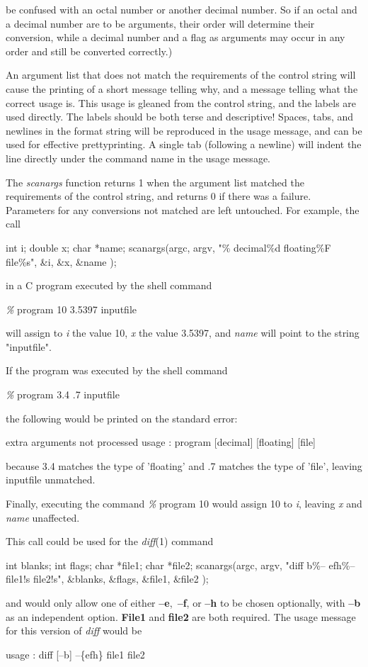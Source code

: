 be confused with an octal number or another decimal number. So if an
octal and a decimal number are to be arguments, their order will determine
their conversion, while a decimal number and a flag as arguments may occur
in any order and still be converted correctly.)
\par
An argument list that does not match the requirements of the control
string will cause the printing of a short message telling why, and
a message telling what the correct usage is.
This usage is gleaned from the control string, and the labels are used
directly.  The labels should be both terse and descriptive!  Spaces, tabs,
and newlines in the format string will be reproduced in the usage message,
and can be used for effective prettyprinting.  A single tab (following a
newline) will indent the line directly under the command name in the usage
message.
\par
The
{\it scanargs}
function returns 1 when the argument list matched the requirements
of the control string, and returns 0 if there was a failure.
Parameters for any conversions not matched are left untouched.
\nwl
For example, the call
\par
int i; double x; char *name;
\nwl
scanargs(argc, argv, "\% decimal\%d floating\%F file\%s",
\ind{15.0em}
\&i, \&x, \&name );
\par
in a C program executed by the shell command
\par
{\it \%}
program 10 3.5397 inputfile
\par
will assign to 
{\it i}
the value 10, 
{\it x}
the value 3.5397, and
{\it name}
will point to the string "inputfile".
\par
If the program was executed by the shell command
\par
{\it \%}
program  3.4 .7 inputfile
\par
the following would be printed on the standard error:
\par
extra arguments not processed
\nwl
usage : program [decimal] [floating] [file]
\par
because 3.4 matches the type of 'floating' and .7 matches
the type of 'file', leaving inputfile unmatched.
\par
Finally, executing the command
\nwl
{\it \%}
program 10
\nwl
would assign 10 to 
{\it i}{\rm ,}
leaving
{\it x}
and
{\it name}
unaffected.
\par
This call could be used for the 
{\it diff}{\rm (1)}
command
\par
int blanks; int flags; char *file1; char *file2;
\nwl
scanargs(argc, argv, "diff b\%-- efh\%-- file1!s file2!s",
\ind{15.0em}
\&blanks, \&flags, \&file1, \&file2 );
\par
and would only allow one of either 
{\bf --e}{\rm ,\ }{\bf --f}{\rm ,}
or
{\bf --h}
to be chosen optionally, with 
{\bf --b} 
as an independent option.
{\bf File1}
and
{\bf file2}
are both required.
The usage message for this version of
{\it diff}
would be
\par
usage : diff [--b] --\{efh\} file1 file2

